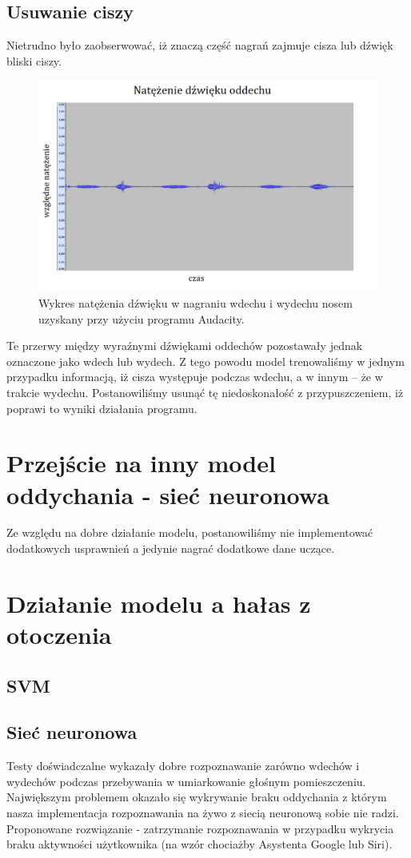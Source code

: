 \documentclass[polish]{article}
\begin{document}
\subsection{Usuwanie ciszy}
Nietrudno było zaobserwować, iż znaczą część nagrań zajmuje cisza lub dźwięk bliski ciszy.
\begin{figure}[H]
	\centering
	\includegraphics[width=13cm]{natezenie_wydech_nosem}
	\caption{Wykres natężenia dźwięku w nagraniu wdechu i wydechu nosem uzyskany przy użyciu programu Audacity.}
\end{figure}
Te przerwy między wyraźnymi dźwiękami oddechów pozostawały jednak oznaczone jako wdech lub wydech. Z tego powodu model trenowaliśmy w jednym przypadku informacją, iż cisza występuje podczas wdechu, a w innym -- że w trakcie wydechu. Postanowiliśmy usunąć tę niedoskonałość z przypuszczeniem, iż poprawi to wyniki działania programu.
\section{Przejście na inny model oddychania - sieć neuronowa}
Ze względu na dobre działanie modelu, postanowiliśmy nie implementować dodatkowych usprawnień a jedynie nagrać dodatkowe dane uczące.
\section{Działanie modelu a hałas z otoczenia}
\subsection{SVM}
\subsection{Sieć neuronowa}
Testy doświadczalne wykazały dobre rozpoznawanie zarówno wdechów i wydechów podczas przebywania w umiarkowanie głośnym pomieszczeniu. Największym problemem okazało się wykrywanie braku oddychania z którym nasza implementacja rozpoznawania na żywo z siecią neuronową sobie nie radzi.
	Proponowane rozwiązanie - zatrzymanie rozpoznawania w przypadku wykrycia braku aktywności użytkownika (na wzór chociażby Asystenta Google lub Siri).
\end{document}
